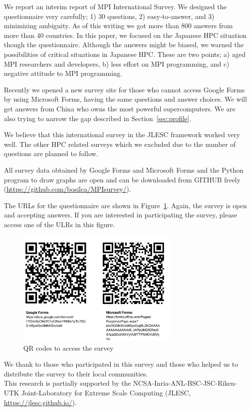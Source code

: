 \documentclass[submit,techrep,noauthor,english]{ipsj}
\begin{document}
We report an interim report of MPI International Survey. We designed
the questionnaire very carefully; 1) 30 questions, 2) easy-to-answer,
and 3) minimizing ambiguity. As of this writing we got more than 800
answers from more than 40 countries. In this paper, we focused on the
Japanese HPC situation though the questionnaire. Although the answers
might be biased, we warned the possibilities of critical situations
in Japanese HPC. These are two points; a) aged MPI researchers and
developers, b) less effort on MPI programming, and c) negative
attitude to MPI programming. 

Recently we opened a new survey site for those who cannot access
Google Forms by using Microsoft Forms, having the same questions and
answer choices. We will get answers from China who owns the most
powerful supercomputers. We are also trying to narrow the gap
described in Section~\ref{sec:profile}. 

We believe that this international survey in the JLESC framework worked
very well.  The other HPC related surveys which we excluded due to the
number of questions are planned to follow.

All survey data obtained by Google Forms and Microsoft Forms and the
Python program to draw graphs are open and can be downloaded from
GITHUB freely (\url{https://github.com/bosilca/MPIsurvey/}).

The URLs for the questionnaire are shown in
Figure~\ref{fig:QR-codes}. Again, the survey is open and accepting
answers. If you are interested in participating the survey, please
access one of the ULRs in this figure.

\begin{figure}[htb]
\begin{center}
\includegraphics[width=8cm]{figs/QR-codes.pdf}
\caption{QR codes to access the survey}
\label{fig:QR-codes}
\end{center}
\end{figure}

\begin{acknowledgment}
  We thank to those who participated in this survey and those who
  helped us to distribute the survey to their local communities.\\
  This research is partially supported by the
  NCSA-Inria-ANL-BSC-JSC-Riken-UTK Joint-Laboratory for Extreme Scale
  Computing (JLESC, \url{https://jlesc.github.io/}).
\end{acknowledgment}




\end{document}
